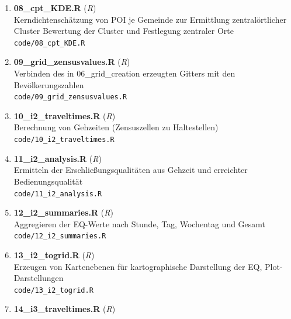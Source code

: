 \begin{enumerate}[label=B\arabic*, ref=B\arabic*, leftmargin=*, itemsep=0.5em, topsep=0.3em]
\begin{enumerate}[label=B\arabic{enumi}-\arabic*, ref=B\arabic{enumi}-\arabic*, leftmargin=*, itemsep=0.5em, topsep=0.3em]
\item \textbf{08\_cpt\_KDE.R} \textnormal{(\textit{R})}\\
Kerndichtenschätzung von POI je Gemeinde zur Ermittlung zentralörtlicher Cluster
Bewertung der Cluster und Festlegung zentraler Orte\\
\texttt{\small code/08\_cpt\_KDE.R}
\edef\appendixlabelkey{app:B\arabic{enumi}-\arabic{enumii}}
\expandafter\label\expandafter{\appendixlabelkey}
\item \textbf{09\_grid\_zensusvalues.R} \textnormal{(\textit{R})}\\
Verbinden des in 06\_grid\_creation erzeugten Gitters mit den Bevölkerungszahlen\\
\texttt{\small code/09\_grid\_zensusvalues.R}
\edef\appendixlabelkey{app:B\arabic{enumi}-\arabic{enumii}}
\expandafter\label\expandafter{\appendixlabelkey}
\item \textbf{10\_i2\_traveltimes.R} \textnormal{(\textit{R})}\\
Berechnung von Gehzeiten (Zensuszellen zu Haltestellen)\\
\texttt{\small code/10\_i2\_traveltimes.R}
\edef\appendixlabelkey{app:B\arabic{enumi}-\arabic{enumii}}
\expandafter\label\expandafter{\appendixlabelkey}
\item \textbf{11\_i2\_analysis.R} \textnormal{(\textit{R})}\\
Ermitteln der Erschließungsqualitäten aus Gehzeit und erreichter Bedienungsqualität\\
\texttt{\small code/11\_i2\_analysis.R}
\edef\appendixlabelkey{app:B\arabic{enumi}-\arabic{enumii}}
\expandafter\label\expandafter{\appendixlabelkey}
\item \textbf{12\_i2\_summaries.R} \textnormal{(\textit{R})}\\
Aggregieren der EQ-Werte nach Stunde, Tag, Wochentag und Gesamt\\
\texttt{\small code/12\_i2\_summaries.R}
\edef\appendixlabelkey{app:B\arabic{enumi}-\arabic{enumii}}
\expandafter\label\expandafter{\appendixlabelkey}
\item \textbf{13\_i2\_togrid.R} \textnormal{(\textit{R})}\\
Erzeugen von Kartenebenen für kartographische Darstellung der EQ, Plot-Darstellungen\\
\texttt{\small code/13\_i2\_togrid.R}
\edef\appendixlabelkey{app:B\arabic{enumi}-\arabic{enumii}}
\expandafter\label\expandafter{\appendixlabelkey}
\item \textbf{14\_i3\_traveltimes.R} \textnormal{(\textit{R})}\\

\end{enumerate}
\end{enumerate}
